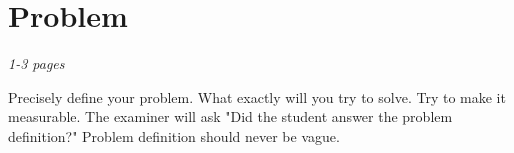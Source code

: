 \chapter{Problem}
\label{ch:problem}
\textit{1-3 pages}

Precisely define your problem.
What exactly will you try to solve.
Try to make it measurable.
The examiner will ask "Did the student answer the problem
definition?"
Problem definition should never be vague.